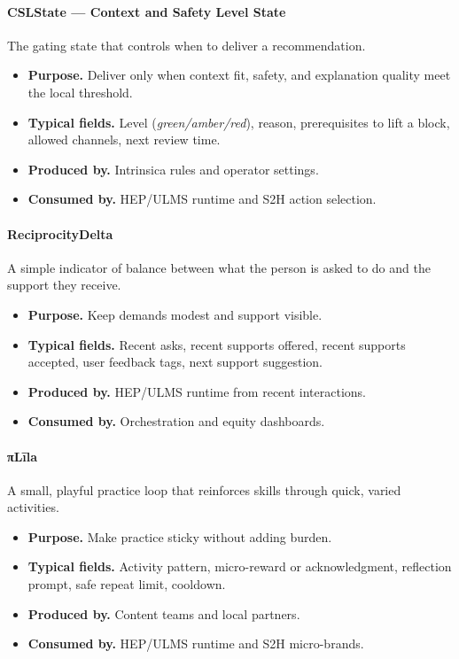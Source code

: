 \documentclass[12pt]{article}
\begin{document}
\paragraph{CSLState — Context and Safety Level State}
The gating state that controls when to deliver a recommendation.
\begin{itemize}[leftmargin=*]
  \item \textbf{Purpose.} Deliver only when context fit, safety, and explanation quality meet the local threshold.
  \item \textbf{Typical fields.} Level (\textit{green/amber/red}), reason, prerequisites to lift a block, allowed channels, next review time.
  \item \textbf{Produced by.} Intrinsica rules and operator settings.
  \item \textbf{Consumed by.} HEP/ULMS runtime and S2H action selection.
\end{itemize}

\paragraph{ReciprocityDelta}
A simple indicator of balance between what the person is asked to do and the support they receive.
\begin{itemize}[leftmargin=*]
  \item \textbf{Purpose.} Keep demands modest and support visible.
  \item \textbf{Typical fields.} Recent asks, recent supports offered, recent supports accepted, user feedback tags, next support suggestion.
  \item \textbf{Produced by.} HEP/ULMS runtime from recent interactions.
  \item \textbf{Consumed by.} Orchestration and equity dashboards.
\end{itemize}

\paragraph{πLīla}
A small, playful practice loop that reinforces skills through quick, varied activities.
\begin{itemize}[leftmargin=*]
  \item \textbf{Purpose.} Make practice sticky without adding burden.
  \item \textbf{Typical fields.} Activity pattern, micro-reward or acknowledgment, reflection prompt, safe repeat limit, cooldown.
  \item \textbf{Produced by.} Content teams and local partners.
  \item \textbf{Consumed by.} HEP/ULMS runtime and S2H micro-brands.
\end{itemize}
\end{document}
